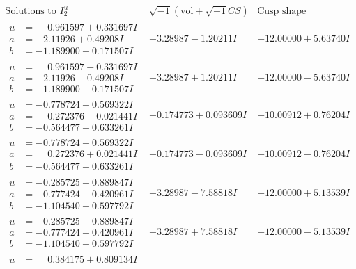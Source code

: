 \documentclass[1p]{elsarticle_modified}
\theoremstyle{definition}
\newcommand{\I}{\sqrt{-1}}
\begin{document}
$$\begin{array}{c|c|c}  
\text{Solutions to }I^u_{2}& \I (\text{vol} + \sqrt{-1}CS) & \text{Cusp shape}\\
 \hline 
\begin{aligned}
u &= \phantom{-}0.961597 + 0.331697 I \\
a &= -2.11926 + 0.49208 I \\
b &= -1.189900 + 0.171507 I\end{aligned}
 & -3.28987 - 1.20211 I & -12.00000 + 5.63740 I \\ \hline\begin{aligned}
u &= \phantom{-}0.961597 - 0.331697 I \\
a &= -2.11926 - 0.49208 I \\
b &= -1.189900 - 0.171507 I\end{aligned}
 & -3.28987 + 1.20211 I & -12.00000 - 5.63740 I \\ \hline\begin{aligned}
u &= -0.778724 + 0.569322 I \\
a &= \phantom{-}0.272376 - 0.021441 I \\
b &= -0.564477 - 0.633261 I\end{aligned}
 & -0.174773 + 0.093609 I & -10.00912 + 0.76204 I \\ \hline\begin{aligned}
u &= -0.778724 - 0.569322 I \\
a &= \phantom{-}0.272376 + 0.021441 I \\
b &= -0.564477 + 0.633261 I\end{aligned}
 & -0.174773 - 0.093609 I & -10.00912 - 0.76204 I \\ \hline\begin{aligned}
u &= -0.285725 + 0.889847 I \\
a &= -0.777424 + 0.420961 I \\
b &= -1.104540 - 0.597792 I\end{aligned}
 & -3.28987 - 7.58818 I & -12.00000 + 5.13539 I \\ \hline\begin{aligned}
u &= -0.285725 - 0.889847 I \\
a &= -0.777424 - 0.420961 I \\
b &= -1.104540 + 0.597792 I\end{aligned}
 & -3.28987 + 7.58818 I & -12.00000 - 5.13539 I \\ \hline\begin{aligned}
u &= \phantom{-}0.384175 + 0.809134 I \\

\end{aligned}
\end{array}$$
\end{document}
